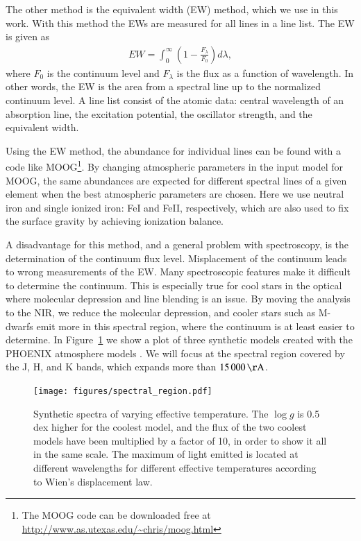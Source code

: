 \documentclass{aa}
\begin{document}
The other method is the equivalent width (EW) method, which we use in this
work. With this method the EWs are measured for all lines in a line list. The
EW is given as
\begin{align}
    \label{eq:EW}
    EW = \int_0^\infty \left(1 - \frac{F_\lambda}{F_0}\right) d\lambda,
\end{align}
where $F_0$ is the continuum level and $F_\lambda$ is the flux as a
function of wavelength. In other words, the EW is the area from a
spectral line up to the normalized continuum level. A line list consist
of the atomic data: central wavelength of an absorption line, the
excitation potential, the oscillator strength, and the equivalent width.

Using the EW method, the abundance for individual lines can be found
with a code like MOOG\footnote{The MOOG code can be downloaded free
at \url{http://www.as.utexas.edu/~chris/moog.html}}. By changing
atmospheric parameters in the input model for MOOG, the same abundances
are expected for different spectral lines of a given element when the
best atmospheric parameters are chosen. Here we use neutral iron and
single ionized iron: FeI and FeII, respectively, which are also used to
fix the surface gravity by achieving ionization balance.

A disadvantage for this method, and a general problem with spectroscopy,
is the determination of the continuum flux level. Misplacement of the
continuum leads to wrong measurements of the EW. Many spectroscopic
features make it difficult to determine the continuum. This is
especially true for cool stars in the optical where molecular depression
and line blending is an issue. By moving the analysis to the NIR, we
reduce the molecular depression, and cooler stars such as M-dwarfs
emit more in this spectral region, where the continuum is at least
easier to determine. In Figure~\ref{fig:spectral_region} we show a plot
of three synthetic models created with the PHOENIX atmosphere models
\citep{Husser2013}. We will focus at the spectral region covered by the
J, H, and K bands, which expands more than $\SI{15000}{\AA}$.

\begin{figure}[tbp!]
    \centering
    \texttt{[image: figures/spectral\_region.pdf]}
    \caption{Synthetic spectra of varying effective temperature. The $\log g$
    is 0.5 dex higher for the coolest model, and the flux of the two coolest models
    have been multiplied by a factor of 10, in order to show it all in the same
    scale. The maximum of light emitted is located at different wavelengths for
    different effective temperatures according to Wien's displacement law.}
    \label{fig:spectral_region}
\end{figure}
\end{document}
